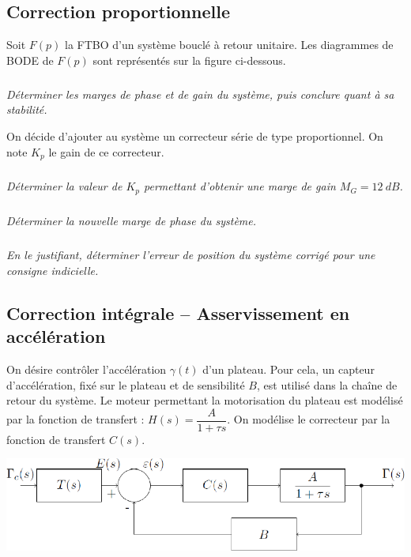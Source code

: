\documentclass[10pt,fleqn]{article} %
\begin{document}

\vspace{5cm}
\pagestyle{fancy}
\thispagestyle{plain}

\def\columnseprulecolor{\color{ocre}}
\setlength{\columnseprule}{0.4pt} 

\def\pathfig{images}

\begin{multicols}{2}
\subsection*{Correction proportionnelle}
Soit $F(p)$ la FTBO d'un système bouclé à retour unitaire. Les diagrammes de BODE de $F(p)$ sont représentés
sur la figure ci-dessous.

\subparagraph{}\textit{Déterminer les marges de phase et de gain du système, puis conclure quant à sa stabilité.}


On décide d’ajouter au système un correcteur série de type proportionnel. On note $K_p$ le gain de ce
correcteur.

\subparagraph{}\textit{Déterminer la valeur de $K_p$ permettant d’obtenir une marge de gain $M_G =\SI{12}{dB}$.}

\subparagraph{}\textit{Déterminer la nouvelle marge de phase du système.}

\subparagraph{}\textit{En le justifiant, déterminer l’erreur de position du système corrigé pour une consigne indicielle.}


\subsection*{Correction intégrale -- Asservissement en accélération}
\setcounter{exo}{0}
On désire contrôler l'accélération $\gamma(t)$ d'un plateau. Pour cela, un capteur d'accélération, fixé sur le plateau
et de sensibilité $B$, est utilisé dans la chaîne de retour du système. Le moteur permettant la motorisation du
plateau est modélisé par la fonction de transfert : $H(s)=\dfrac{A}{1+\tau s}$. 
On modélise le correcteur par la fonction de transfert $C(s)$.
\begin{center}
\includegraphics[width=\linewidth]{images/fig_02}
\end{center}


\end{multicols}
\end{document}
